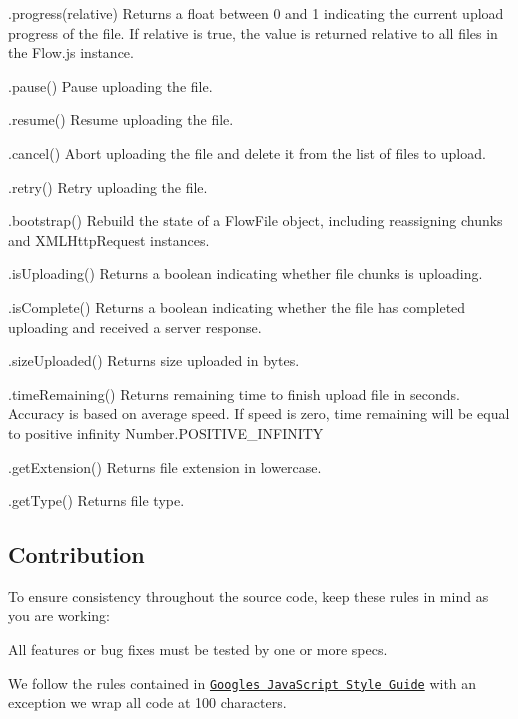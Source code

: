 \begin{DoxyItemize}
\item {\ttfamily .progress(relative)} Returns a float between 0 and 1 indicating the current upload progress of the file. If {\ttfamily relative} is {\ttfamily true}, the value is returned relative to all files in the Flow.\+js instance.
\item {\ttfamily .pause()} Pause uploading the file.
\item {\ttfamily .resume()} Resume uploading the file.
\item {\ttfamily .cancel()} Abort uploading the file and delete it from the list of files to upload.
\item {\ttfamily .retry()} Retry uploading the file.
\item {\ttfamily .bootstrap()} Rebuild the state of a {\ttfamily Flow\+File} object, including reassigning chunks and X\+M\+L\+Http\+Request instances.
\item {\ttfamily .is\+Uploading()} Returns a boolean indicating whether file chunks is uploading.
\item {\ttfamily .is\+Complete()} Returns a boolean indicating whether the file has completed uploading and received a server response.
\item {\ttfamily .size\+Uploaded()} Returns size uploaded in bytes.
\item {\ttfamily .time\+Remaining()} Returns remaining time to finish upload file in seconds. Accuracy is based on average speed. If speed is zero, time remaining will be equal to positive infinity {\ttfamily Number.\+P\+O\+S\+I\+T\+I\+V\+E\+\_\+\+I\+N\+F\+I\+N\+I\+TY}
\item {\ttfamily .get\+Extension()} Returns file extension in lowercase.
\item {\ttfamily .get\+Type()} Returns file type.
\end{DoxyItemize}

\subsection*{Contribution}

To ensure consistency throughout the source code, keep these rules in mind as you are working\+:


\begin{DoxyItemize}
\item All features or bug fixes must be tested by one or more specs.
\item We follow the rules contained in \href{http://google-styleguide.googlecode.com/svn/trunk/javascriptguide.xml}{\tt Google\textquotesingle{}s Java\+Script Style Guide} with an exception we wrap all code at 100 characters.
\end{DoxyItemize}

